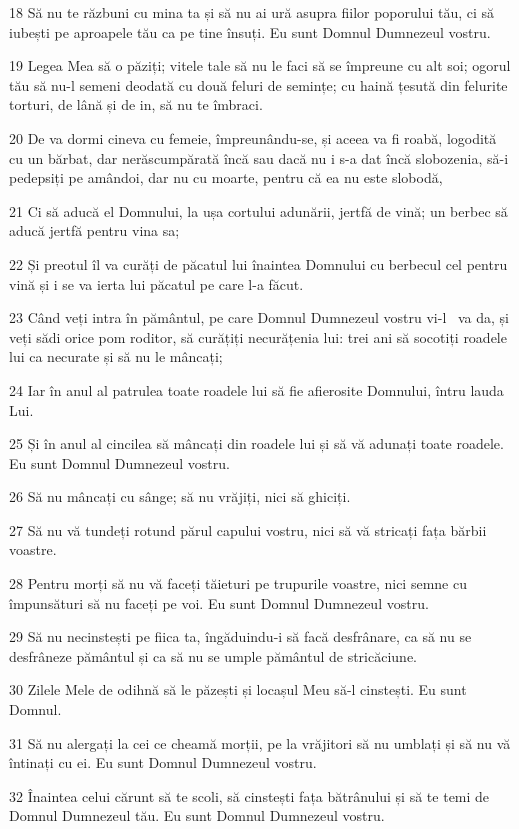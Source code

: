 \par 18 Să nu te răzbuni cu mina ta și să nu ai ură asupra fiilor poporului tău, ci să iubești pe aproapele tău ca pe tine însuți. Eu sunt Domnul Dumnezeul vostru.
\par 19 Legea Mea să o păziți; vitele tale să nu le faci să se împreune cu alt soi; ogorul tău să nu-l semeni deodată cu două feluri de semințe; cu haină țesută din felurite torturi, de lână și de in, să nu te îmbraci.
\par 20 De va dormi cineva cu femeie, împreunându-se, și aceea va fi roabă, logodită cu un bărbat, dar nerăscumpărată încă sau dacă nu i s-a dat încă slobozenia, să-i pedepsiți pe amândoi, dar nu cu moarte, pentru că ea nu este slobodă,
\par 21 Ci să aducă el Domnului, la ușa cortului adunării, jertfă de vină; un berbec să aducă jertfă pentru vina sa;
\par 22 Și preotul îl va curăți de păcatul lui înaintea Domnului cu berbecul cel pentru vină și i se va ierta lui păcatul pe care l-a făcut.
\par 23 Când veți intra în pământul, pe care Domnul Dumnezeul vostru vi-l  va da, și veți sădi orice pom roditor, să curățiți necurățenia lui: trei ani să socotiți roadele lui ca necurate și să nu le mâncați;
\par 24 Iar în anul al patrulea toate roadele lui să fie afierosite Domnului, întru lauda Lui.
\par 25 Și în anul al cincilea să mâncați din roadele lui și să vă adunați toate roadele. Eu sunt Domnul Dumnezeul vostru.
\par 26 Să nu mâncați cu sânge; să nu vrăjiți, nici să ghiciți.
\par 27 Să nu vă tundeți rotund părul capului vostru, nici să vă stricați fața bărbii voastre.
\par 28 Pentru morți să nu vă faceți tăieturi pe trupurile voastre, nici semne cu împunsături să nu faceți pe voi. Eu sunt Domnul Dumnezeul vostru.
\par 29 Să nu necinstești pe fiica ta, îngăduindu-i să facă desfrânare, ca să nu se desfrâneze pământul și ca să nu se umple pământul de stricăciune.
\par 30 Zilele Mele de odihnă să le păzești și locașul Meu să-l cinstești. Eu sunt Domnul.
\par 31 Să nu alergați la cei ce cheamă morții, pe la vrăjitori să nu umblați și să nu vă întinați cu ei. Eu sunt Domnul Dumnezeul vostru.
\par 32 Înaintea celui cărunt să te scoli, să cinstești fața bătrânului și să te temi de Domnul Dumnezeul tău. Eu sunt Domnul Dumnezeul vostru.
